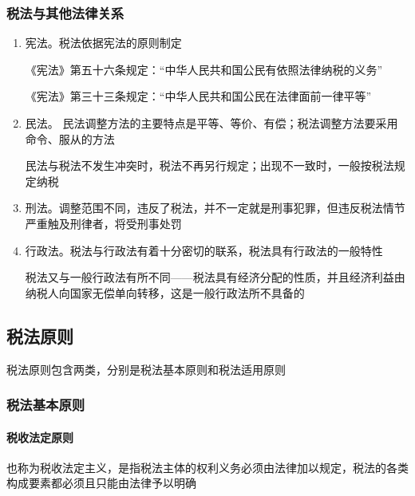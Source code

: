 \documentclass[UTF8,12pt]{ctexart}
\numberwithin{equation}{section} %
\numberwithin{figure}{section}
\numberwithin{table}{section}
\begin{document}
	\subsubsection{税法与其他法律关系}
	\begin{enumerate}
		\item 宪法。税法依据宪法的原则制定
		
		《宪法》第五十六条规定：“中华人民共和国公民有依照法律纳税的义务”
		
		《宪法》第三十三条规定：“中华人民共和国公民在法律面前一律平等”
		
		\item 民法。 民法调整方法的主要特点是平等、等价、有偿；税法调整方法要采用命令、服从的方法
		
		民法与税法不发生冲突时，税法不再另行规定；出现不一致时，一般按税法规定纳税
		
		\item 刑法。调整范围不同，违反了税法，并不一定就是刑事犯罪，但违反税法情节严重触及刑律者，将受刑事处罚
		
		\item 行政法。税法与行政法有着十分密切的联系，税法具有行政法的一般特性

		税法又与一般行政法有所不同——税法具有经济分配的性质，并且经济利益由纳税人向国家无偿单向转移，这是一般行政法所不具备的
	\end{enumerate}
	
	\subsection{税法原则}
	税法原则包含两类，分别是税法基本原则和税法适用原则
	\subsubsection{税法基本原则}
	\paragraph{税收法定原则}也称为税收法定主义，是指税法主体的权利义务必须由法律加以规定，税法的各类构成要素都必须且只能由法律予以明确
	
\end{document}
